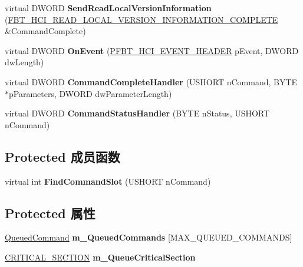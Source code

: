 \begin{DoxyCompactItemize}
\item 
\mbox{\label{class_c_hci_local_aa76ef727fd9286c6e2dba5c89b7cbd8d}} 
virtual D\+W\+O\+RD {\bfseries Send\+Read\+Local\+Version\+Information} (\hyperlink{struct_f_b_t___h_c_i___r_e_a_d___l_o_c_a_l___v_e_r_s_i_o_n___i_n_f_o_r_m_a_t_i_o_n___c_o_m_p_l_e_t_e}{F\+B\+T\+\_\+\+H\+C\+I\+\_\+\+R\+E\+A\+D\+\_\+\+L\+O\+C\+A\+L\+\_\+\+V\+E\+R\+S\+I\+O\+N\+\_\+\+I\+N\+F\+O\+R\+M\+A\+T\+I\+O\+N\+\_\+\+C\+O\+M\+P\+L\+E\+TE} \&Command\+Complete)
\item 
\mbox{\label{class_c_hci_local_a469495c3922f383a4654a5e215193370}} 
virtual D\+W\+O\+RD {\bfseries On\+Event} (\hyperlink{struct_f_b_t___h_c_i___e_v_e_n_t___h_e_a_d_e_r}{P\+F\+B\+T\+\_\+\+H\+C\+I\+\_\+\+E\+V\+E\+N\+T\+\_\+\+H\+E\+A\+D\+ER} p\+Event, D\+W\+O\+RD dw\+Length)
\item 
\mbox{\label{class_c_hci_local_a4487b1b1e30d246f638874fa918db9be}} 
virtual D\+W\+O\+RD {\bfseries Command\+Complete\+Handler} (U\+S\+H\+O\+RT n\+Command, B\+Y\+TE $\ast$p\+Parameters, D\+W\+O\+RD dw\+Parameter\+Length)
\item 
\mbox{\label{class_c_hci_local_a364801687183baf0f7fe59dd7ca3a491}} 
virtual D\+W\+O\+RD {\bfseries Command\+Status\+Handler} (B\+Y\+TE n\+Status, U\+S\+H\+O\+RT n\+Command)
\end{DoxyCompactItemize}
\subsection*{Protected 成员函数}
\begin{DoxyCompactItemize}
\item 
\mbox{\label{class_c_hci_local_adf6d794268a51c0d03701d39c6d6fb5e}} 
virtual int {\bfseries Find\+Command\+Slot} (U\+S\+H\+O\+RT n\+Command)
\end{DoxyCompactItemize}
\subsection*{Protected 属性}
\begin{DoxyCompactItemize}
\item 
\mbox{\label{class_c_hci_local_a5f17020827d1a022265aecd8f91d360c}} 
\hyperlink{struct___queued_command}{Queued\+Command} {\bfseries m\+\_\+\+Queued\+Commands} \mbox{[}M\+A\+X\+\_\+\+Q\+U\+E\+U\+E\+D\+\_\+\+C\+O\+M\+M\+A\+N\+DS\mbox{]}
\item 
\mbox{\label{class_c_hci_local_a0b3c823b64ed1e6789015c746474cbef}} 
\hyperlink{struct___c_r_i_t_i_c_a_l___s_e_c_t_i_o_n}{C\+R\+I\+T\+I\+C\+A\+L\+\_\+\+S\+E\+C\+T\+I\+ON} {\bfseries m\+\_\+\+Queue\+Critical\+Section}
\end{DoxyCompactItemize}
